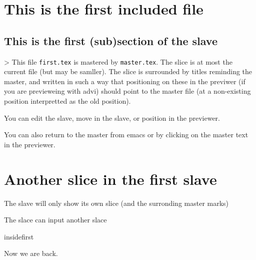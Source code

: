 
\section {This is the first included file}

\subsection {This is the first (sub)section of the slave}
 >
This file {\tt first.tex} is mastered by {\tt master.tex}.  The slice is at
most the current file (but may be samller).  The slice is surrounded by
titles reminding the master, and written in such a way that positioning on
these in the previwer (if you are previeweing with advi) should point to the
master file (at a non-existing position interpretted as the old position).

You can edit the slave, move in the slave, or position in the previewer. 

You can also return to the master from emacs or by clicking on the master
text in the previewer.

\section {Another slice in the first slave}

The slave will only show its own slice (and the surronding master marks)

The slace can input another slace

 {insidefirst}

Now we are back.



